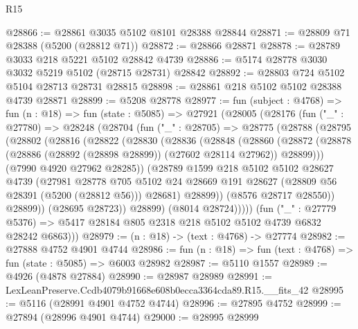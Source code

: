 \begin{lexlean}{R15}
\begin{coremodule}
{{{{{{{{{{{@28866 := @28861 @3035 @5102 @8101 @28388 @28844
@28871 := @28809 @71 @28388 (@5200 (@28812 @71))
@28872 := @28866 @28871
@28878 := @28789 @3033 @218 @5221 @5102 @28842 @4739
@28886 := @5174 @28778 @3030 @3032 @5219 @5102 (@28715 @28731) @28842
@28892 := @28803 @724 @5102 @5104 @28713 @28731 @28815
@28898 := @28861 @218 @5102 @5102 @28388 @4739 @28871
@28899 := @5208 @28778
@28977 := fun (subject : @4768) =>
  fun (n : @18) =>
  fun (state : @5085) =>
  @27921
    (@28005
      (@28176
        (fun ("_" : @27780) =>
        @28248
          (@28704
            (fun ("_" : @28705) =>
            @28775
              (@28788
                (@28795
                  (@28802
                    (@28816
                      (@28822
                        (@28830
                          (@28836
                            (@28848
                              (@28860
                                (@28872
                                  (@28878
                                    (@28886 (@28892 (@28898 @28899)) (@27602 @28114 @27962))
                                    @28899)))
                              (@7990 @4920 @27962 @28285))
                            (@28789
                              @1599
                              @218
                              @5102
                              @5102
                              @28627
                              @4739
                              (@27981
                                @28778
                                @705
                                @5102
                                @24
                                @28669
                                @191
                                @28627
                                (@28809 @56 @28391 (@5200 (@28812 @56)))
                                @28681)
                              @28899))
                          (@8576 @28717 @28550))
                        @28899))
                    (@28695 @28723))
                  @28899)
                (@8014 @28724)))))
        (fun ("_" : @27779 @5376) =>
        @5417 @28184 @805 @2318 @218 @5102 @5102 @4739 @6832 @28242 @6863)))
@28979 := (n : @18) -> (text : @4768) -> @27774
@28982 := @27888 @4752 @4901 @4744
@28986 := fun (n : @18) => fun (text : @4768) => fun (state : @5085) => @6003 @28982
@28987 := @5110 @1557
@28989 := @4926 (@4878 @27884)
@28990 := @28987 @28989
@28991 := LexLeanPreserve.Ccdb4079b91668e608b0ecca3364cda89.R15.__fits_42
@28995 := @5116 (@28991 @4901 @4752 @4744)
@28996 := @27895 @4752
@28999 := @27894 (@28996 @4901 @4744)
@29000 := @28995 @28999
}}}}}}}}}}}
\end{coremodule}
\end{lexlean}

